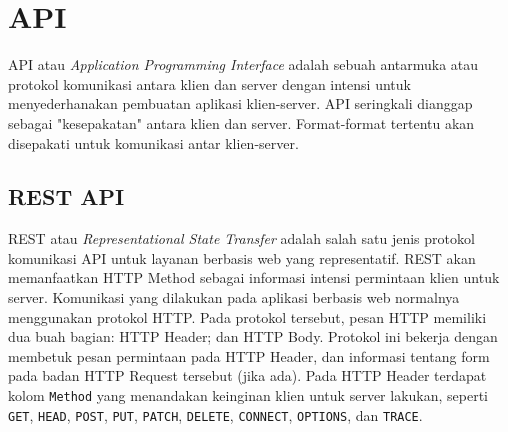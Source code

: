     
\section{API}
    API atau \textit{Application Programming Interface} adalah sebuah antarmuka atau protokol komunikasi antara klien dan server dengan intensi untuk menyederhanakan pembuatan aplikasi klien-server. 
    API seringkali dianggap sebagai "kesepakatan" antara klien dan server. Format-format tertentu akan disepakati untuk komunikasi antar klien-server\cite{health-informatics}.
    
    \subsection{REST API}
    REST atau \textit{Representational State Transfer} adalah salah satu jenis protokol komunikasi API untuk layanan berbasis web yang representatif\cite{rest:roy-fielding}. REST akan memanfaatkan HTTP Method sebagai informasi intensi permintaan klien untuk server. Komunikasi yang dilakukan pada aplikasi berbasis web normalnya menggunakan protokol HTTP. Pada protokol tersebut, pesan HTTP memiliki dua buah bagian: HTTP Header; dan HTTP Body\cite{RFC7231}. Protokol ini bekerja dengan membetuk pesan permintaan pada HTTP Header, dan informasi tentang form pada badan HTTP Request tersebut (jika ada). Pada HTTP Header terdapat kolom \texttt{Method} yang menandakan keinginan klien untuk server lakukan, seperti \texttt{GET}, \texttt{HEAD}, \texttt{POST}, \texttt{PUT}, \texttt{PATCH}, \texttt{DELETE}, \texttt{CONNECT}, \texttt{OPTIONS}, dan \texttt{TRACE}\cite[P.~21]{RFC7231}. 

